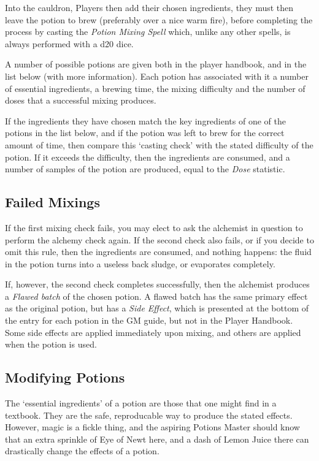 Into the cauldron, Players then add their chosen ingredients, they must then leave the potion to brew (preferably over a nice warm fire), before completing the process by casting the {\it Potion Mixing Spell} which, unlike any other spells, is always performed with a d20 dice. 

A number of possible potions are given both in the player handbook, and in the list below (with more information). Each potion has associated with it a number of essential ingredients, a brewing time, the mixing difficulty and the number of doses that a successful mixing produces. 

If the ingredients they have chosen match the key ingredients of one of the potions in the list below, and if the potion was left to brew for the correct amount of time, then compare this `casting check' with the stated difficulty of the potion. If it exceeds the difficulty, then the ingredients are consumed, and a number of samples of the potion are produced, equal to the {\it Dose} statistic. 

\subsection{Failed Mixings}

If the first mixing check fails, you may elect to ask the alchemist in question to perform the alchemy check again. If the second check also fails, or if you decide to omit this rule, then the ingredients are consumed, and nothing happens: the fluid in the potion turns into a useless back sludge, or evaporates completely. 

If, however, the second check completes successfully, then the alchemist produces a {\it Flawed batch} of the chosen potion. A flawed batch has the same primary effect as the original potion, but has a {\it Side Effect}, which is presented at the bottom of the entry for each potion in the GM guide, but not in the Player Handbook. Some side effects are applied immediately upon mixing, and others are applied when the potion is used. 

\subsection{Modifying Potions}

The `essential ingredients' of a potion are those that one might find in a textbook. They are the safe, reproducable way to produce the stated effects. However, magic is a fickle thing, and the aspiring Potions Master should know that an extra sprinkle of Eye of Newt here, and a dash of Lemon Juice there can drastically change the effects of a potion.  

